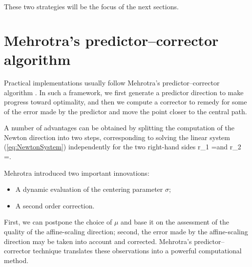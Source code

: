 
These two strategies will be the focus of the next sections.


%
%
\section{Mehrotra's predictor--corrector algorithm}
\label{sec:MehrotraPC}

Practical implementations usually follow Mehrotra's predictor--corrector 
algorithm \cite{Mehrotra92}. In such a framework, we first generate a 
predictor direction to make progress toward optimality, and then we 
compute a corrector to remedy for some of the error made by the predictor
and move the point closer to the central path.

A number of advantages can be obtained by splitting the computation 
of the Newton direction into two steps, corresponding to solving the linear
system (\ref{eq:NewtonSystem}) independently for the two right-hand 
sides 
\be \label{eq:PredictorRhs}
r_1 = \quad \mbox{and} \quad
r_2 =\left[ 
  \begin{array}{c}
    0 \\ 0 \\ \mu e
  \end{array} \right].
\ee

Mehrotra \cite{Mehrotra92} introduced two important innovations: 
\begin{itemize}
\item A dynamic evaluation of the centering parameter $\sigma$;
\item A second order correction.
\end{itemize}

First, we can postpone the choice of $\mu$ and base it
on the assessment of the quality of the affine-scaling direction;
second, the error made by the affine-scaling direction may be 
taken into account and
corrected. Mehrotra's predictor--corrector technique \cite{Mehrotra92}
translates these observations into a powerful computational method.


